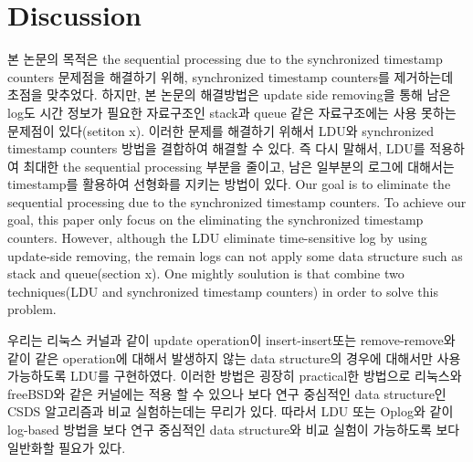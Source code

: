 \section{Discussion}

\ifkor
본 논문의 목적은 the sequential processing due to the synchronized timestamp counters
문제점을 해결하기 위해, synchronized timestamp counters를 제거하는데 초점을 맞추었다.
하지만, 본 논문의 해결방법은 update side removing을 통해 남은 log도 시간 정보가 필요한
자료구조인 stack과 queue 같은 자료구조에는 사용 못하는 문제점이 있다(setiton x).
이러한 문제를 해결하기 위해서  LDU와 synchronized timestamp counters 방법을 
결합하여 해결할 수 있다.
즉 다시 말해서, LDU를 적용하여 최대한  the sequential processing 부분을 줄이고, 
남은 일부분의 로그에 대해서는 timestamp를 활용하여 선형화를 지키는 방법이 있다. 
\else
Our goal is to eliminate the sequential processing due to the synchronized
timestamp counters.
To achieve our goal, this paper only focus on the eliminating the synchronized
timestamp counters.
However, although the LDU eliminate time-sensitive log by using update-side
removing, the remain logs can not apply some data structure such as stack and
queue(section x).
One mightly soulution is that combine two techniques(LDU and synchronized
timestamp counters) in order to solve this problem.

\fi


\ifkor
우리는 리눅스 커널과 같이 update operation이 insert-insert또는 remove-remove와 같이 같은 operation에
대해서 발생하지 않는 data structure의 경우에 대해서만 사용 가능하도록 LDU를 구현하였다.
이러한 방법은 굉장히 practical한 방법으로 리눅스와 freeBSD와 같은 커널에는 적용 할 수 있으나 
보다 연구 중심적인 data structure인 CSDS 알고리즘과 비교 실험하는데는 무리가 있다. 
따라서 LDU 또는 Oplog와 같이 log-based 방법을 보다 연구 중심적인 data structure와 비교 실험이
가능하도록 보다 일반화할 필요가 있다. 
\else


